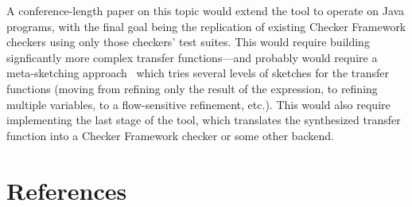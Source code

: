 \documentclass[10pt,conference]{IEEEtran}
\begin{document}
A conference-length paper on this topic would extend the tool to operate
on Java programs, with the final goal being the replication of
existing Checker Framework checkers using only those checkers'
test suites. This would require building signficantly more
complex transfer functions---and probably would require
a meta-sketching approach~\cite{metasketching} which tries several levels of
sketches for the transfer functions (moving from refining only the result of the expression, to
refining multiple variables, to a flow-sensitive refinement, etc.).
This would also require implementing the last stage of the tool, which
translates the synthesized transfer function into a Checker Framework
checker or some other backend.

\section{References}

\begingroup
\renewcommand{\section}[2]{}%



%
%
\endgroup
\end{document}
